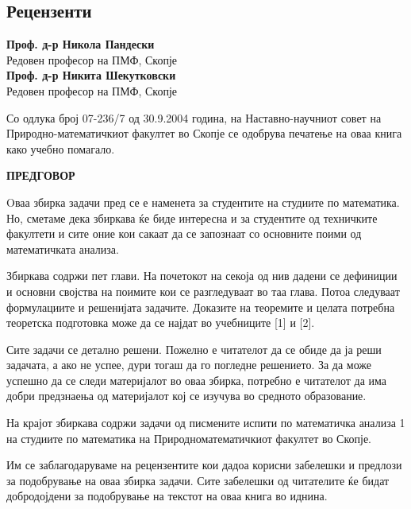 \documentclass[12pt]{article}
\begin{document}
\begin{flushleft}
    \section*{Рецензенти}
    \textbf{Проф. д-р Никола Пандески}\\
    Редовен професор на ПМФ, Скопје\\
    \textbf{Проф. д-р Никита Шекутковски}\\
    Редовен професор на ПМФ, Скопје\\
\end{flushleft}
\vfill
{\selectfont
    Со одлука број 07-236/7 од 30.9.2004 година, на
    Наставно-научниот совет на Природно-математичкиот
    факултет во Скопје се одобрува печатење на оваа книга како
    учебно помагало.
}
\clearpage
\begin{center}
    \large{\textbf{ПРЕДГОВОР}}
\end{center}
\par
\large
Oваа збирка задачи пред се е наменета за студентите на
студиите по математика. Но, сметаме дека збиркава ќе биде
интересна и за студентите од техничките факултети и сите оние кои
сакаат да се запознаат со основните поими од математичката
анализа.\par
Збиркава содржи пет глави. На почетокот на секоја од нив
дадени се дефиниции и основни својства на поимите кои се
разгледуваат во таа глава. Потоа следуваат формулациите и
решенијата задачите. Доказите на теоремите и целата потребна
теоретска подготовка може да се најдат во учебниците [1] и [2].\par
Сите задачи се детално решени. Пожелно е читателот да се
обиде да ја реши задачата, а ако не успее, дури тогаш да го погледне
решението. За да може успешно да се следи материјалот во оваа
збирка, потребно е читателот да има добри предзнаења од
материјалот кој се изучува во средното образование.\par
На крајот збиркава содржи задачи од писмените испити по
математичка анализа 1 на студиите по математика на Природноматематичкиот факултет во Скопје.\par
Им се заблагодаруваме на рецензентите кои дадоа корисни
забелешки и предлози за подобрување на оваа збирка задачи. Сите
забелешки од читателите ќе бидат добродојдени за подобрување на
текстот на оваа книга во иднина.
\vfill
\clearpage
\newpage
\
\newpage
\end{document}
